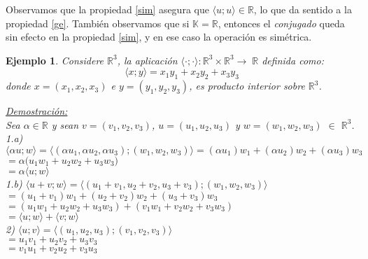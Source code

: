 \documentclass[12pt]{book}
\newtheorem{ejem}{Ejemplo}
\def\R{\mathbb{R}}
\def\K{\mathbb{K}}
\begin{document}
{Observamos que la propiedad \ref{sim} asegura que $\langle u; u\rangle\in \R$, lo que da sentido a la propiedad \ref{ge}.
También observamos que si $\K=\R$, entonces el \emph{conjugado} queda sin efecto en la propiedad \ref{sim}, y en ese caso la operación es simétrica.

\begin{ejem}
Considere $\R^3$, la aplicaci\'on $\langle \cdot; \cdot \rangle:\R^3\times \R^3\rightarrow\;\R$ definida como:
   $$\langle x;y\rangle =x_1y_1+x_2y_2+x_3y_3$$
donde $x=(x_1,x_2,x_3)$ e $y=(y_1,y_2,y_3)$, es producto interior sobre $\R^3$.

\underline{Demostraci\'on:}\\
{\em 
Sea $\alpha\in\R$ y sean $v=(v_1,v_2,v_3)$, $u=(u_1,u_2,u_3)$ y $w=(w_1,w_2,w_3)$ $\in$ $\R^3$.\\

1.a) $\langle \alpha u; w \rangle=\langle (\alpha u_1,\alpha u_2,\alpha u_3);(w_1,w_2,w_3)\rangle=(\alpha u_1)w_1+(\alpha u_2)w_2+(\alpha u_3)w_3$\\

\hspace{8.1 cm}$=\alpha\Big( u_1w_1+ u_2w_2+ u_3w_3\Big)$\\

\hspace{8.1 cm}$=\alpha\langle u; w \rangle$\\

1.b) $\langle u+v; w \rangle=\langle (u_1+v_1,u_2+v_2,u_3+v_3);(w_1,w_2,w_3)\rangle$\\

\hspace{2.7 cm}$=(u_1+v_1)w_1+(u_2+v_2)w_2+(u_3+v_3)w_3$\\

\hspace{2.7 cm}$=(u_1w_1+u_2w_2+u_3w_3)+(v_1w_1+v_2w_2+v_3w_3)$\\

\hspace{2.7 cm}$=\langle u; w \rangle+\langle v; w \rangle$\\

2)  $\langle u; v \rangle=\langle (u_1,u_2,u_3);(v_1,v_2,v_3)\rangle$\\

\hspace{1.6 cm}$=u_1v_1+u_2v_2+u_3v_3$\\

\hspace{1.6 cm}$=v_1u_1+v_2u_2+v_3u_3$\\

}
\end{ejem}}
\end{document}
